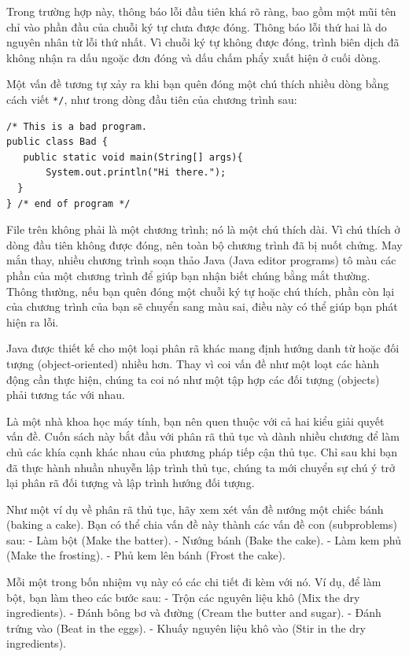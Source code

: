 Trong trường hợp này, thông báo lỗi đầu tiên khá rõ ràng, bao gồm một
mũi tên chỉ vào phần đầu của chuỗi ký tự chưa được đóng. Thông báo lỗi
thứ hai là do nguyên nhân từ lỗi thứ nhất. Vì chuỗi ký tự không được
đóng, trình biên dịch đã không nhận ra dấu ngoặc đơn đóng và dấu chấm
phẩy xuất hiện ở cuối dòng.

Một vấn đề tương tự xảy ra khi bạn quên đóng một chú thích nhiều dòng
bằng cách viết \texttt{*/}, như trong dòng đầu tiên của chương trình
sau:

\begin{verbatim}
/* This is a bad program.
public class Bad {
   public static void main(String[] args){
       System.out.println("Hi there.");
  }
} /* end of program */
\end{verbatim}

File trên không phải là một chương trình; nó là một chú thích dài. Vì
chú thích ở dòng đầu tiên không được đóng, nên toàn bộ chương trình đã
bị nuốt chửng. May mắn thay, nhiều chương trình soạn thảo Java (Java
editor programs) tô màu các phần của một chương trình để giúp bạn nhận
biết chúng bằng mắt thường. Thông thường, nếu bạn quên đóng một chuỗi ký
tự hoặc chú thích, phần còn lại của chương trình của bạn sẽ chuyển sang
màu sai, điều này có thể giúp bạn phát hiện ra lỗi.

Java được thiết kế cho một loại phân rã khác mang định hướng danh từ
hoặc đối tượng (object-oriented) nhiều hơn. Thay vì coi vấn đề như một
loạt các hành động cần thực hiện, chúng ta coi nó như một tập hợp các
đối tượng (objects) phải tương tác với nhau.

Là một nhà khoa học máy tính, bạn nên quen thuộc với cả hai kiểu giải
quyết vấn đề. Cuốn sách này bắt đầu với phân rã thủ tục và dành nhiều
chương để làm chủ các khía cạnh khác nhau của phương pháp tiếp cận thủ
tục. Chỉ sau khi bạn đã thực hành nhuần nhuyễn lập trình thủ tục, chúng
ta mới chuyển sự chú ý trở lại phân rã đối tượng và lập trình hướng đối
tượng.

Như một ví dụ về phân rã thủ tục, hãy xem xét vấn đề nướng một chiếc
bánh (baking a cake). Bạn có thể chia vấn đề này thành các vấn đề con
(subproblems) sau: - Làm bột (Make the batter). - Nướng bánh (Bake the
cake). - Làm kem phủ (Make the frosting). - Phủ kem lên bánh (Frost the
cake).

Mỗi một trong bốn nhiệm vụ này có các chi tiết đi kèm với nó. Ví dụ, để
làm bột, bạn làm theo các bước sau: - Trộn các nguyên liệu khô (Mix the
dry ingredients). - Đánh bông bơ và đường (Cream the butter and sugar).
- Đánh trứng vào (Beat in the eggs). - Khuấy nguyên liệu khô vào (Stir
in the dry ingredients).

